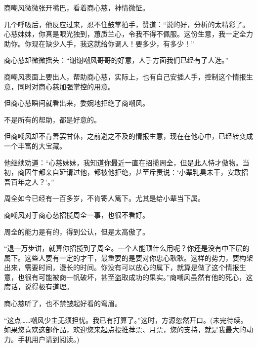 \begin{this_body}
商嘲风微微张开嘴巴，看着商心慈，神情微怔。

几个呼吸后，他反应过来，忍不住鼓掌拍手，赞道：“说的好，分析的太精彩了。心慈妹妹，你真是眼光独到，蕙质兰心，令我不得不佩服。这份生意，我一定全力助你。你现在缺少人手，我这就给你调人！要多少，有多少！”

商心慈却微微摇头：“谢谢嘲风哥哥的好意，人手方面我们已经有了人选。”

商嘲风表面上要出人，帮助商心慈，实际上，也有自己安插人手，控制这个情报生意，同时对商心慈加强掌控的用意。

但商心慈瞬间就看出来，委婉地拒绝了商嘲风。

不是所有的帮助，都是好意的。

但商嘲风却不肯善罢甘休，之前避之不及的情报生意，现在在他心中，已经转变成一个丰富的大宝藏。

他继续劝道：“心慈妹妹，我知道你最近一直在招揽周全，但是此人恃才傲物。当初，商囚牛都亲自延请过他，都被他拒绝，甚至斥责说：‘小辈乳臭未干，安敢招吾百年之人？’。”

周全如今已经有一百多岁，不肯寄人篱下。尤其是给小辈当下属。

商嘲风对于商心慈招揽周全一事，也很不看好。

周全的能力是有的，得到公认，但是太高傲了。

“退一万步讲，就算你招揽到了周全。一个人能顶什么用呢？你还是没有中下层的属下。这些人要有一定的才干，最重要的是要对你忠心耿耿。这样的势力，要构架出来，需要时间，漫长的时间。你没有可以放心的属下，就算是做了这个情报生意，也很有可能被商一帆破坏，甚至盗取成功的果实。”商嘲风虽然有他的死心，这席话，说得极有道理。

商心慈听了，也不禁皱起好看的弯眉。

“这点……嘲风少主无须担忧。我已有打算了。”这时，方源忽然开口。(未完待续。如果您喜欢这部作品，欢迎您来起点投推荐票、月票，您的支持，就是我最大的动力。手机用户请到阅读。)

\end{this_body}

